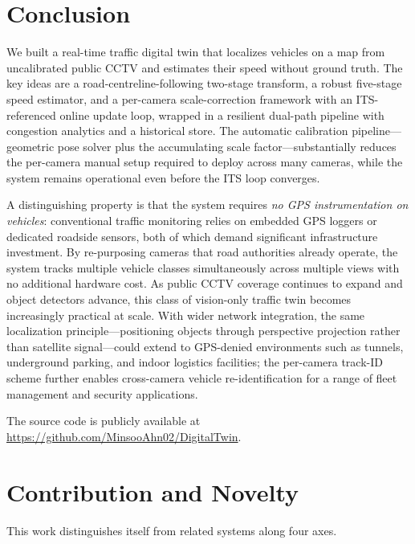 \documentclass[conference]{IEEEtran}
\renewcommand{\_}{\textunderscore\allowbreak}
\begin{document}
\section{Conclusion}\label{sec:concl}
We built a real-time traffic digital twin that localizes vehicles on a map from
uncalibrated public CCTV and estimates their speed without ground truth. The key
ideas are a road-centreline-following two-stage transform, a robust five-stage speed
estimator, and a per-camera scale-correction framework with an ITS-referenced online
update loop, wrapped in a resilient dual-path pipeline with congestion analytics and
a historical store. The automatic calibration pipeline---geometric pose solver plus
the accumulating scale factor---substantially reduces the per-camera manual setup
required to deploy across many cameras, while the system remains operational even
before the ITS loop converges.

A distinguishing property is that the system requires \emph{no GPS instrumentation
on vehicles}: conventional traffic monitoring relies on embedded GPS loggers or
dedicated roadside sensors, both of which demand significant infrastructure
investment. By re-purposing cameras that road authorities already operate, the
system tracks multiple vehicle classes simultaneously across multiple views with no
additional hardware cost. As public CCTV coverage continues to expand and object
detectors advance, this class of vision-only traffic twin becomes increasingly
practical at scale. With wider network integration, the same localization
principle---positioning objects through perspective projection rather than satellite
signal---could extend to GPS-denied environments such as tunnels, underground
parking, and indoor logistics facilities; the per-camera track-ID scheme further
enables cross-camera vehicle re-identification for a range of fleet management and
security applications.

The source code is publicly available at \url{https://github.com/MinsooAhn02/DigitalTwin}.

\section*{Contribution and Novelty}
This work distinguishes itself from related systems along four axes.
\end{document}
